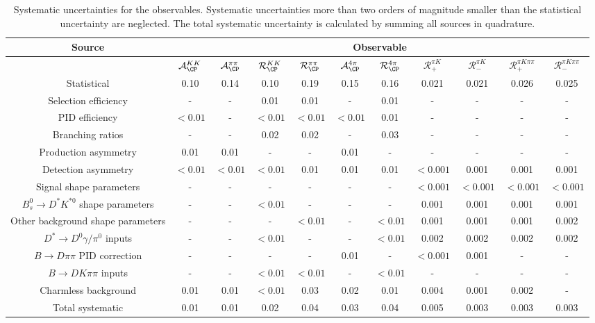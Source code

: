 \begin{sidewaystable}
  \centering
  \caption{Systematic uncertainties for the observables. Systematic uncertainties more than two orders of magnitude smaller than the statistical uncertainty are neglected. The total systematic uncertainty is calculated by summing all sources in quadrature.}
  \begin{tabular}{ccccccccccc}
      \toprule
      Source & \multicolumn{10}{c}{Observable} \\
      \midrule
       & $\mathcal{A}_{\CP}^{KK}$ & $\mathcal{A}_{\CP}^{\pi\pi}$ & $\mathcal{R}_{\CP}^{KK}$ & $\mathcal{R}_{\CP}^{\pi\pi}$ & $\mathcal{A}_{\CP}^{4\pi}$ & $\mathcal{R}_{\CP}^{4\pi}$ & $\mathcal{R}_+^{\pi K}$ & $\mathcal{R}_-^{\pi K}$ & $\mathcal{R}_+^{\pi K\pi\pi}$ & $\mathcal{R}_-^{\pi K\pi\pi}$ \\
      \midrule
      Statistical & 0.10 & 0.14 & 0.10 & 0.19 & 0.15 & 0.16 & 0.021 & 0.021 & 0.026 & 0.025 \\
      \midrule
      Selection efficiency & -  & -  & 0.01 & 0.01 & -  & 0.01 & -  & -  & -  & -  \\
      PID efficiency & $<0.01$ & -  & $<0.01$ & $<0.01$ & $<0.01$ & 0.01 & -  & -  & -  & -  \\
      Branching ratios & -  & -  & 0.02 & 0.02 & -  & 0.03 & -  & -  & -  & -  \\
      Production asymmetry & 0.01 & 0.01 & -  & -  & 0.01 & -  & -  & -  & -  & -  \\
      Detection asymmetry & $<0.01$ & $<0.01$ & $<0.01$ & 0.01 & 0.01 & 0.01 & $<0.001$ & 0.001 & 0.001 & 0.001 \\
      Signal shape parameters & -  & -  & -  & -  & -  & -  & $<0.001$ & $<0.001$ & $<0.001$ & $<0.001$ \\
      $B^0_s \to D^* K^{*0}$ shape parameters & -  & -  & $<0.01$ & -  & -  & -  & 0.001 & 0.001 & 0.001 & 0.001 \\
      Other background shape parameters & -  & -  & -  & $<0.01$ & -  & $<0.01$ & 0.001 & 0.001 & 0.001 & 0.002 \\
      $D^* \to D^0 \gamma/\pi^0$ inputs & -  & -  & $<0.01$ & -  & -  & $<0.01$ & 0.002 & 0.002 & 0.002 & 0.002 \\
      $B\to D\pi\pi$ PID correction & -  & -  & -  & -  & 0.01 & -  & $<0.001$ & 0.001 & -  & -  \\
      $B\to DK\pi\pi$ inputs & -  & -  & $<0.01$ & $<0.01$ & -  & $<0.01$ & -  & -  & -  & -  \\
      Charmless background & 0.01 & 0.01 & $<0.01$ & 0.03 & 0.02 & 0.01 & 0.004 & 0.001 & 0.002 & -  \\
      \midrule
      Total systematic & 0.01 & 0.01 & 0.02 & 0.04 & 0.03 & 0.04 & 0.005 & 0.003 & 0.003 & 0.003 \\
      \bottomrule
  \end{tabular}
\label{tab:systematics}
\end{sidewaystable}
